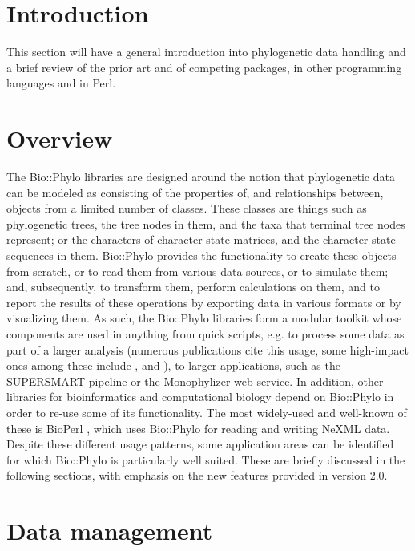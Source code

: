 \documentclass{bioinfo}
\begin{document}
\section{Introduction}

This section will have a general introduction into phylogenetic data handling and a brief
review of the prior art and of competing packages, in other programming languages and in
Perl.

\section{Overview}

The Bio::Phylo libraries are designed around the notion that phylogenetic data can be 
modeled as consisting of the properties of, and relationships between, objects from a 
limited number of classes. These classes are things such as phylogenetic trees, the tree 
nodes in them, and the taxa that terminal tree nodes represent; or the characters of 
character state matrices, and the character state sequences in them. Bio::Phylo provides 
the functionality to create these objects from scratch, or to read them from various data 
sources, or to simulate them; and, subsequently, to transform them, perform calculations 
on them, and to report the results of these operations by exporting data in various 
formats or by visualizing them. As such, the Bio::Phylo libraries form a modular toolkit 
whose components are used in anything from quick scripts, e.g. to process some data as 
part of a larger analysis (numerous publications cite this usage, some high-impact ones 
among these include \citet{hayward2015pan}, \citet{hayward2013broad} and 
\citet{de2013convergent}), to larger applications, such as the SUPERSMART pipeline 
\citep{Antonelli10092016} or the Monophylizer \citep{Mutanen01112016} web service. In 
addition, other libraries for bioinformatics and computational biology depend on 
Bio::Phylo in order to re-use some of its functionality. The most widely-used and 
well-known of these is BioPerl \citep{stajich2002bioperl}, which uses Bio::Phylo for 
reading and writing NeXML \citep{vos2012nexml} data. Despite these different usage 
patterns, some application areas can be identified for which Bio::Phylo is particularly 
well suited. These are briefly discussed in the following sections, with emphasis on the 
new features provided in version 2.0.

\section{Data management}
\end{document}
